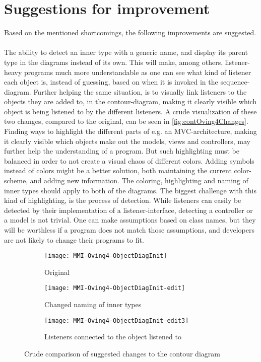\section{Suggestions for improvement}\label{jiveSuggestions}

Based on the mentioned shortcomings, the following improvements are suggested.
~\\

The ability to detect an inner type with a generic name, and display its parent type in the diagrams instead of its own.
This will make, among others, listener-heavy programs much more understandable as one can see what kind of listener each object is, instead of guessing, based on when it is invoked in the sequence-diagram.
Further helping the same situation, is to visually link listeners to the objects they are added to, in the contour-diagram, making it clearly visible which object is being listened to by the different listeners.
A crude visualization of these two changes, compared to the original, can be seen in \autoref{fig:contOving4Changes}.
~\\

Finding ways to highlight the different parts of e.g. an MVC-architecture, making it clearly visible which objects make out the models, views and controllers, may further help the understanding of a program.
But such highlighting must be balanced in order to not create a visual chaos of different colors.
Adding symbols instead of colors might be a better solution, both maintaining the current color-scheme, and adding new information.
The coloring, highlighting and naming of inner types should apply to both of the diagrams.
The biggest challenge with this kind of highlighting, is the process of detection.
While listeners can easily be detected by their implementation of a listener-interface, detecting a controller or a model is not trivial.
One can make assumptions based on class names, but they will be worthless if a program does not match those assumptions, and developers are not likely to change their programs to fit.
~\\

\begin{figure}[H]
	\centering
	\begin{subfigure}{\textwidth}
		\centering
		\texttt{[image: MMI-Oving4-ObjectDiagInit]}
		\caption{Original}
		\label{fig:contOving4ChangesA}
	\end{subfigure}
	\begin{subfigure}{\textwidth}
		\centering
		\texttt{[image: MMI-Oving4-ObjectDiagInit-edit]}
		\caption{Changed naming of inner types}
		\label{fig:contOving4ChangesB}
	\end{subfigure}
	\begin{subfigure}{\textwidth}
		\centering
		\texttt{[image: MMI-Oving4-ObjectDiagInit-edit3]}
		\caption{Listeners connected to the object listened to}
		\label{fig:contOving4ChangesC}
	\end{subfigure}
	\caption{Crude comparison of suggested changes to the contour diagram}
	\label{fig:contOving4Changes} 
\end{figure}


